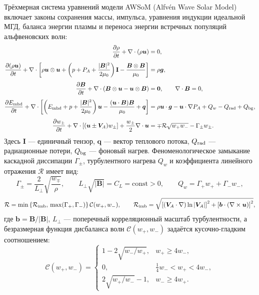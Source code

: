 \documentclass[11pt,a4paper]{article}
\begin{document}
Трёхмерная система уравнений модели AWSoM (Alfv\'en Wave Solar Model) включает законы сохранения массы, импульса, уравнения индукции идеальной МГД, баланса энергии плазмы и переноса энергии встречных популяций альфвеновских волн:
\begin{align}
\frac{\partial\rho}{\partial t} + \nabla\cdot(\rho\bm{u}) &= 0,
\label{eq:3d_mass}\\[4pt]
\frac{\partial(\rho\bm{u})}{\partial t} + \nabla\cdot\left[\rho\bm{u}\otimes\bm{u} + \left(p + P_A + \frac{|\bm{B}|^2}{2\mu_0}\right)\mathbf{I} - \frac{\bm{B}\otimes\bm{B}}{\mu_0}\right] &= \rho\bm{g},
\label{eq:3d_momentum}\\[4pt]
\frac{\partial\bm{B}}{\partial t} + \nabla\cdot(\bm{B}\otimes\bm{u} - \bm{u}\otimes\bm{B}) &= \bm{0}, \qquad \nabla\cdot\bm{B} = 0,
\label{eq:3d_induction}\\[4pt]
\frac{\partial E_{\rm mhd}}{\partial t} + \nabla\cdot\left[\left(E_{\rm mhd} + p + \frac{|\bm{B}|^2}{2\mu_0}\right)\bm{u} - \frac{(\bm{u}\cdot\bm{B})\bm{B}}{\mu_0} + \bm{q}\right] &= \rho\bm{u}\cdot\bm{g} - \bm{u}\cdot\nabla P_A + Q_w - Q_{\rm rad} + Q_{\rm bg},
\label{eq:3d_energy}\\[4pt]
\frac{\partial w_\pm}{\partial t} + \nabla\cdot\left[(\bm{u} \pm \bm{V}_A)w_\pm\right] + \frac{w_\pm}{2}\nabla\cdot\bm{u} &= \mp\mathcal{R}\sqrt{w_+ w_-} - \Gamma_\pm w_\pm.
\label{eq:3d_waves}
\end{align}
Здесь $\mathbf{I}$ --- единичный тензор, $\bm{q}$ --- вектор теплового потока, $Q_{\rm rad}$ --- радиационные потери, $Q_{\rm bg}$ --- фоновый нагрев. Феноменологическое замыкание каскадной диссипации $\Gamma_\pm$, турбулентного нагрева $Q_w$ и коэффициента линейного отражения $\mathcal{R}$ имеет вид:
\begin{equation}
\Gamma_\pm = \frac{2}{L_\perp}\sqrt{\frac{w_\mp}{\rho}}, \qquad
L_\perp\sqrt{|\bm{B}|} = C_L = \mathrm{const} > 0, \qquad
Q_w = \Gamma_+ w_+ + \Gamma_- w_-,
\label{eq:3d_dissipation}
\end{equation}
\begin{equation}
\mathcal{R} = \min\left\{\mathcal{R}_{\rm imb},\, \max(\Gamma_+,\Gamma_-)\right\}\mathcal{C}(w_+, w_-), \qquad
\mathcal{R}_{\rm imb} = \sqrt{\left[(\bm{V}_A\cdot\nabla)\ln|\bm{V}_A|\right]^2 + \left[\bm{b}\cdot(\nabla\times\bm{u})\right]^2},
\label{eq:3d_reflection}
\end{equation}
где $\bm{b} = \bm{B}/|\bm{B}|$, $L_\perp$ --- поперечный корреляционный масштаб турбулентности, а безразмерная функция дисбаланса волн $\mathcal{C}(w_+, w_-)$ задаётся кусочно-гладким соотношением:
\begin{equation}
\mathcal{C}(w_+, w_-) =
\begin{cases}
1 - 2\sqrt{w_-/w_+}, & w_+ \ge 4w_-,\\[4pt]
0, & \frac{1}{4}w_- < w_+ < 4w_-,\\[4pt]
2\sqrt{w_+/w_-} - 1, & w_- \ge 4w_+.
\end{cases}
\label{eq:imbalance_func}
\end{equation}
\end{document}
